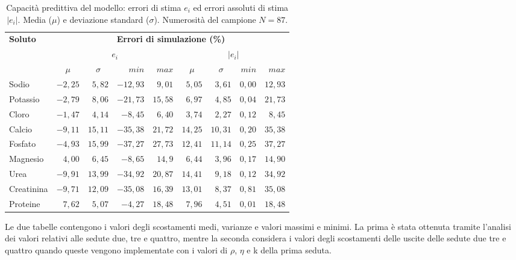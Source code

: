 \documentclass[10pt,twoside]{book}
\begin{document}
\begin{table}[htb]
	\centering
	\caption{Capacità predittiva del modello: errori di stima $e_i$ ed errori assoluti di stima $|e_i|$. Media ($\mu$) e deviazione standard ($\sigma$). Numerosità del campione $N=87$.}\label{tab:descrizione}
	\begin{tabular}{lrrrrrrrr}
	\toprule 
		\textbf{Soluto}   &  \multicolumn{8}{c}{\textbf{Errori di simulazione (\%)}}  \\
		\cmidrule(lr){2-9}
				              &        \multicolumn{4}{c}{$e_i$}             &       \multicolumn{4}{c}{$|e_i|$}             \\
		                  & \multicolumn{1}{c}{$\mu$}      & \multicolumn{1}{c}{$\sigma$}   & $min$   & $max$   & \multicolumn{1}{c}{$\mu$}     & \multicolumn{1}{c}{$\sigma$}   & $min$   & $max$  \\
    \cmidrule(lr){2-5}\cmidrule(lr){6-9}
  	Sodio             & $ -2,25$    & $ 5,82$    & $ -12,93$  & $9,01$   & $5,05$   & $3,61$     & $0,00$ & $12,93$   \\
  	Potassio          & $-2,79$     & $ 8,06$    & $-21,73$   & $15,58$  & $6,97$   & $4,85$     & $0,04$ & $21,73$  \\
  	Cloro             & $-1,47$     & $ 4,14$    & $ -8,45$   & $6,40$   & $3,74$   & $2,27$     & $0,12$ & $ 8,45$   \\
  	Calcio            & $-9,11$     & $ 15,11$   & $ -35,38$  & $21,72$  & $14,25$  & $10,31$    & $0,20$ & $35,38$  \\
  	Fosfato           & $-4,93$     & $ 15,99$   & $-37,27$   & $27,73$  & $12,41$  & $11,14$    & $0,25$ & $37,27$  \\
  	Magnesio          & $ 4,00$     & $ 6,45$    & $ -8,65$   & $14,9$   & $6,44$   & $3,96$     & $0,17$ & $14,90$  \\
  	Urea              & $-9,91$     & $13,99$    & $-34,92$   & $20,87$  & $14,41$  & $9,18$     & $0,12$ & $34,92$  \\
  	Creatinina        & $-9,71$     & $12,09$    & $-35,08$   & $16,39$  & $13,01$  & $8,37$     & $0,81$ & $35,08$  \\
  	Proteine          & $ 7,62$     & $5,07$     & $ -4,27$   & $18,48$  & $7,96$   & $4,51$     & $0,01$ & $18,48$  \\
  \bottomrule
\end{tabular}
\end{table}
Le due tabelle contengono i valori degli scostamenti medi, varianze e valori massimi e minimi. La prima è stata ottenuta tramite l'analisi dei valori relativi alle sedute due, tre e quattro, mentre la seconda considera i valori degli scostamenti delle uscite delle sedute due tre e quattro quando queste vengono implementate con i valori di $\rho$, $\eta$ e k della prima seduta.
\end{document}
